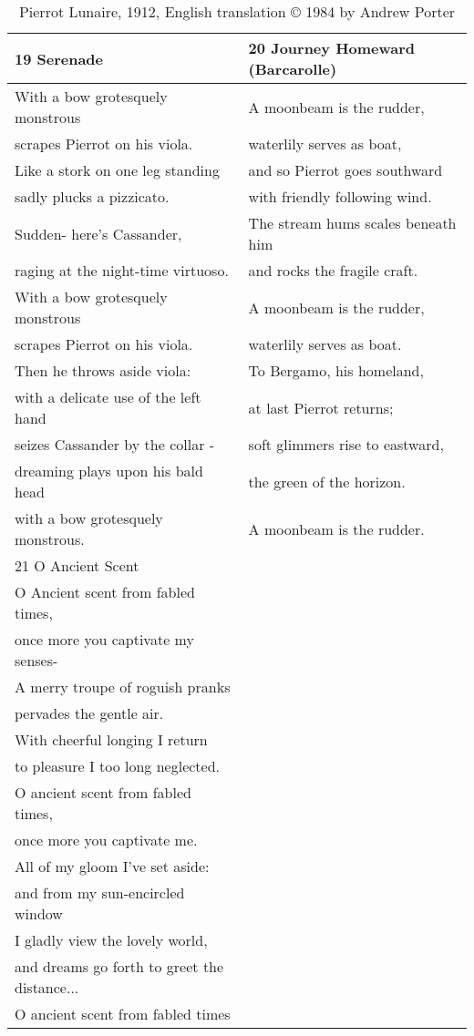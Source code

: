 \newpage
\begin{table}[h!]
\begin{tabular}{p{8.0cm}|p{8.0cm}} \hline

19 Serenade& 20 Journey Homeward (Barcarolle)\\\hline
With a bow grotesquely monstrous & A moonbeam is the rudder,\\
scrapes Pierrot on his viola.& waterlily serves as boat,\\
Like a stork on one leg standing& and so Pierrot goes southward\\
sadly plucks a pizzicato.& with friendly following wind.\\
Sudden- here's Cassander,& The stream hums scales beneath him\\
raging at the night-time virtuoso.& and rocks the fragile craft.\\
With a bow grotesquely monstrous& A moonbeam is the rudder,\\
scrapes Pierrot on his viola.& waterlily serves as boat.\\
Then he throws aside viola:& To Bergamo, his homeland,\\
with a delicate use of the left hand& at last Pierrot returns;\\
seizes Cassander by the collar - & soft glimmers rise to eastward,\\
dreaming plays upon his bald head& the green of the horizon.\\
with a bow grotesquely monstrous.& A moonbeam is the rudder.\\\hline

21 O Ancient Scent & \\\hline
O Ancient scent from fabled times,& \\
once more you captivate my senses- & \\
A merry troupe of roguish pranks& \\
pervades the gentle air.& \\
With cheerful longing I return& \\
to pleasure I too long neglected.& \\
O ancient scent from fabled times,& \\
once more you captivate  me.& \\
All of my gloom I've set aside:& \\
and from my sun-encircled window & \\
I gladly view the lovely world,& \\
and dreams go forth to greet the distance...& \\
O ancient scent from fabled times& \\\hline

\end{tabular}
\caption{Pierrot Lunaire, 1912, English translation © 1984 by Andrew Porter}
\label{tab:pierrottext}
\end{table}

\newpage
